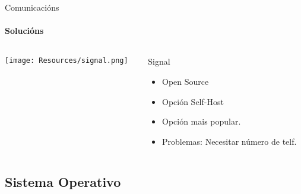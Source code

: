 \documentclass{beamer}
\begin{document}


\begin{frame}{Comunicacións}
  \framesubtitle{Solucións}

  \begin{columns}
    \begin{column}{0.5\textwidth}
      \texttt{[image: Resources/signal.png]}

      \vspace{1cm}


    \end{column}

    \begin{column}{0.4\textwidth}
      \begin{block}{Signal}
        \begin{itemize}
          \item Open Source
          \item Opción Self-Host
          \item Opción mais popular.
          \item Problemas: Necesitar número de telf.
        \end{itemize}
      \end{block}

    \end{column}

  \end{columns}

\end{frame}



\subsection{Sistema Operativo}

\end{document}
